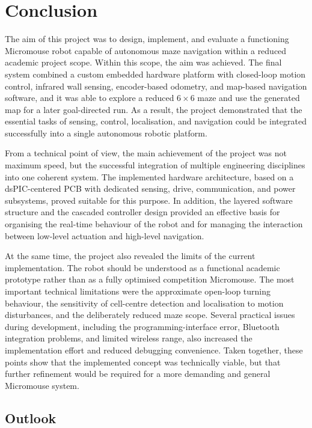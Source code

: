 \section{Conclusion}

The aim of this project was to design, implement, and evaluate a functioning Micromouse robot capable of autonomous maze navigation within a reduced academic project scope. Within this scope, the aim was achieved. The final system combined a custom embedded hardware platform with closed-loop motion control, infrared wall sensing, encoder-based odometry, and map-based navigation software, and it was able to explore a reduced $6 \times 6$ maze and use the generated map for a later goal-directed run. As a result, the project demonstrated that the essential tasks of sensing, control, localisation, and navigation could be integrated successfully into a single autonomous robotic platform.

From a technical point of view, the main achievement of the project was not maximum speed, but the successful integration of multiple engineering disciplines into one coherent system. The implemented hardware architecture, based on a dsPIC-centered PCB with dedicated sensing, drive, communication, and power subsystems, proved suitable for this purpose. In addition, the layered software structure and the cascaded controller design provided an effective basis for organising the real-time behaviour of the robot and for managing the interaction between low-level actuation and high-level navigation.

At the same time, the project also revealed the limits of the current implementation. The robot should be understood as a functional academic prototype rather than as a fully optimised competition Micromouse. The most important technical limitations were the approximate open-loop turning behaviour, the sensitivity of cell-centre detection and localisation to motion disturbances, and the deliberately reduced maze scope. Several practical issues during development, including the programming-interface error, Bluetooth integration problems, and limited wireless range, also increased the implementation effort and reduced debugging convenience. Taken together, these points show that the implemented concept was technically viable, but that further refinement would be required for a more demanding and general Micromouse system.

\subsection{Outlook}

